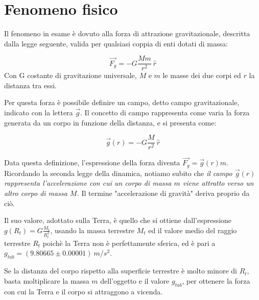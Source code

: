 \documentclass[12pt, a4paper]{article}
\title{\textbf{\scalebox{1.3}{\text{Caduta libera}}}}
\date{}
\begin{document}
\maketitle
{}%

\section{Fenomeno fisico}
Il fenomeno in esame è dovuto alla forza di attrazione gravitazionale, descritta dalla legge seguente, valida per qualsiasi coppia di enti dotati di massa: 


\begin{equation*}
    \Vec{F_g} = -G\frac{M m}{r^2}\ \hat{r}
\end{equation*}
Con G costante di gravitazione universale, $M$ e $m$ le masse dei due corpi ed $r$ la distanza tra essi.

Per questa forza è possibile definire un campo, detto campo gravitazionale, indicato con la lettera $\Vec{g}$. 
Il concetto di campo rappresenta come varia la forza generata da un corpo in funzione della distanza, e si presenta come: 

\begin{equation*}
    \Vec{g}(r) = -G\frac{M}{r^2}\  \hat{r}
\end{equation*}

Data questa definizione, l'espressione della forza diventa $\Vec{F_g} = \Vec{g}(r)m$. 
Ricordando la seconda legge della dinamica, notiamo subito che \textit{il campo $\Vec{g}(r)$ rappresenta l'accelerazione con cui un corpo di massa $m$ viene attratto verso un altro corpo di massa $M$.} 
Il termine "accelerazione di gravità" deriva proprio da ciò.

Il suo valore, adottato sulla Terra, è quello che si ottiene dall'espressione $\displaystyle {g(R_t) = G\frac{M_t}{R_t^2}}$, usando la massa terrestre $M_t$ ed il valore medio del raggio terrestre $R_t$ poichè la Terra non è perfettamente sferica, ed è pari a $g_{tab}=(9.80665\pm 0.00001)\ m/s^2$.

Se la distanza del corpo rispetto alla superficie terrestre è molto minore di $R_t$, basta moltiplicare la massa $m$ dell'oggetto e il valore $g_{tab}$, per ottenere la forza con cui la Terra e il corpo si attraggono a vicenda.
\end{document}
